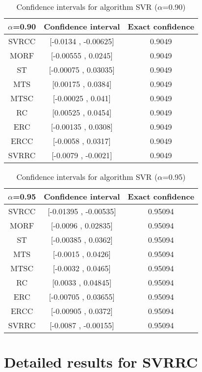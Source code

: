 \documentclass[a4paper,10pt]{article}
\begin{document}
\begin{table}[!htp]
\centering\small
\begin{tabular}{
|c|c|c|}
\hline
 $\alpha$=0.90 & Confidence interval & Exact confidence \\ \hline 
SVRCC & [-0.0134 , -0.00625] & 0.9049\\ \hline 
MORF & [-0.00555 , 0.0245] & 0.9049\\ \hline 
ST & [-0.00075 , 0.03035] & 0.9049\\ \hline 
MTS & [0.00175 , 0.0384] & 0.9049\\ \hline 
MTSC & [-0.00025 , 0.041] & 0.9049\\ \hline 
RC & [0.00525 , 0.0454] & 0.9049\\ \hline 
ERC & [-0.00135 , 0.0308] & 0.9049\\ \hline 
ERCC & [-0.0058 , 0.0317] & 0.9049\\ \hline 
SVRRC & [-0.0079 , -0.0021] & 0.9049\\ \hline 

\end{tabular}
\caption{Confidence intervals for algorithm SVR ($\alpha$=0.90)}
\end{table}
\begin{table}[!htp]
\centering\small
\begin{tabular}{
|c|c|c|}
\hline
 $\alpha$=0.95 & Confidence interval & Exact confidence \\ \hline 
SVRCC & [-0.01395 , -0.00535] & 0.95094\\ \hline 
MORF & [-0.0096 , 0.02835] & 0.95094\\ \hline 
ST & [-0.00385 , 0.0362] & 0.95094\\ \hline 
MTS & [-0.0015 , 0.0426] & 0.95094\\ \hline 
MTSC & [-0.0032 , 0.0465] & 0.95094\\ \hline 
RC & [0.0033 , 0.04845] & 0.95094\\ \hline 
ERC & [-0.00705 , 0.03655] & 0.95094\\ \hline 
ERCC & [-0.00905 , 0.0372] & 0.95094\\ \hline 
SVRRC & [-0.0087 , -0.00155] & 0.95094\\ \hline 

\end{tabular}
\caption{Confidence intervals for algorithm SVR ($\alpha$=0.95)}
\end{table}

 \clearpage 


\section{Detailed results for SVRRC}
\end{document}
